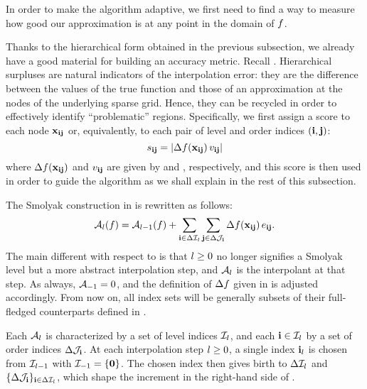 In order to make the algorithm adaptive, we first need to find a way to measure
how good our approximation is at any point in the domain of $f$. 

Thanks to the hierarchical form obtained in the previous subsection, we already
have a good material for building an accuracy metric. Recall .
Hierarchical surpluses are natural indicators of the interpolation error: they
are the difference between the values of the true function and those of an
approximation at the nodes of the underlying sparse grid. Hence, they can be
recycled in order to effectively identify ``problematic'' regions. Specifically,
we first assign a score to each node $\mathbf{x}_{\mathbf{i}\mathbf{j}}$ or, equivalently, to each
pair of level and order indices $(\mathbf{i}, \mathbf{j})$:
\begin{equation} \elab{score}
  \score_{\vi\vj} = \left| \surplus(\vx_{\vi\vj}) \, \w_{\vi\vj} \right|
\end{equation}
where $\Delta f(\mathbf{x}_{\mathbf{i}\mathbf{j}})$ and $v_{\mathbf{i}\mathbf{j}}$ are given by  and
, respectively, and this score is then used in order to guide the
algorithm as we shall explain in the rest of this subsection.

The Smolyak construction in  is rewritten as follows:
\begin{equation} \elab{approximation}
  \approximation{\l}(\f) = \approximation{\l-1}(\f) + \sum_{\vi \in \Delta\lindex_\l} \sum_{\vj \in \Delta\oindex_\vi} \surplus(\vx_{\vi\vj}) \,
\e_{\vi\vj}.
\end{equation}
The main different with respect to  is that $l \geq
0$ no longer signifies a Smolyak level but a more abstract interpolation step,
and $\mathcal{A}_{l}$ is the interpolant at that step. As always,
$\mathcal{A}_{-1} = 0$, and the definition of $\Delta f$ given in
 is adjusted accordingly. From now on, all index sets will be
generally subsets of their full-fledged counterparts defined in .

Each $\mathcal{A}_{l}$ is characterized by a set of level indices
$\mathcal{I}_l$, and each $\mathbf{i} \in \mathcal{I}_l$ by a set of order indices
$\Delta\mathcal{J}_{\mathbf{i}}$. At each interpolation step $l \geq 0$, a single index
$\mathbf{i}_l$ is chosen from $\mathcal{I}_{l-1}$ with $\mathcal{I}_{-1} = \{ \mathbf{0} \}$. The
chosen index then gives birth to $\Delta\mathcal{I}_l$ and $\{ \Delta\mathcal{J}_{\mathbf{i}}
\}_{\mathbf{i} \in \Delta\mathcal{I}_l}$, which shape the increment in the right-hand side
of .

